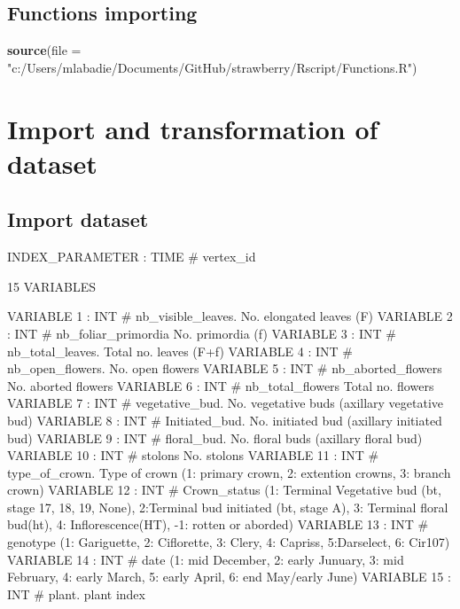 \documentclass[]{article}
\newenvironment{Shaded}{\begin{snugshade}}{\end{snugshade}}
\newcommand{\KeywordTok}[1]{\textcolor[rgb]{0.13,0.29,0.53}{\textbf{#1}}}
\newcommand{\DataTypeTok}[1]{\textcolor[rgb]{0.13,0.29,0.53}{#1}}
\newcommand{\StringTok}[1]{\textcolor[rgb]{0.31,0.60,0.02}{#1}}
\newcommand{\NormalTok}[1]{#1}
\begin{document}
\subsection{Functions importing}\label{functions-importing}

\begin{Shaded}
\begin{Highlighting}[]
\KeywordTok{source}\NormalTok{(}\DataTypeTok{file =} \StringTok{"c:/Users/mlabadie/Documents/GitHub/strawberry/Rscript/Functions.R"}\NormalTok{)}
\end{Highlighting}
\end{Shaded}

\section{Import and transformation of
dataset}\label{import-and-transformation-of-dataset}

\subsection{Import dataset}\label{import-dataset}

INDEX\_PARAMETER : TIME \# vertex\_id

15 VARIABLES

VARIABLE 1 : INT \# nb\_visible\_leaves. No. elongated leaves (F)
VARIABLE 2 : INT \# nb\_foliar\_primordia No. primordia (f) VARIABLE 3 :
INT \# nb\_total\_leaves. Total no. leaves (F+f) VARIABLE 4 : INT \#
nb\_open\_flowers. No. open flowers VARIABLE 5 : INT \#
nb\_aborted\_flowers No. aborted flowers VARIABLE 6 : INT \#
nb\_total\_flowers Total no. flowers VARIABLE 7 : INT \#
vegetative\_bud. No. vegetative buds (axillary vegetative bud) VARIABLE
8 : INT \# Initiated\_bud. No. initiated bud (axillary initiated bud)
VARIABLE 9 : INT \# floral\_bud. No. floral buds (axillary floral bud)
VARIABLE 10 : INT \# stolons No. stolons VARIABLE 11 : INT \#
type\_of\_crown. Type of crown (1: primary crown, 2: extention crowns,
3: branch crown) VARIABLE 12 : INT \# Crown\_status (1: Terminal
Vegetative bud (bt, stage 17, 18, 19, None), 2:Terminal bud initiated
(bt, stage A), 3: Terminal floral bud(ht), 4: Inflorescence(HT), -1:
rotten or aborded) VARIABLE 13 : INT \# genotype (1: Gariguette, 2:
Ciflorette, 3: Clery, 4: Capriss, 5:Darselect, 6: Cir107) VARIABLE 14 :
INT \# date (1: mid December, 2: early Junuary, 3: mid February, 4:
early March, 5: early April, 6: end May/early June) VARIABLE 15 : INT \#
plant. plant index
\end{document}

